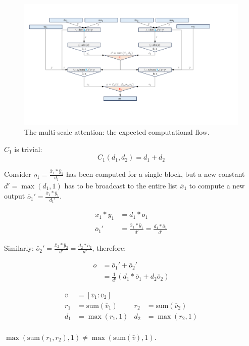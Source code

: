 \begin{figure}[h]
    \centering
    \includegraphics[width=1.\textwidth]{figures/multi-scale-attn2.pdf}
    \caption{The multi-scale attention: the expected computational flow.}
\end{figure}

$C_1$ is trivial:
$$C_1(d_1, d_2) = d_1+d_2$$

Consider $\bar{o}_1 = \frac{\bar{x}_1*\bar{y}_1}{d_1}$ has been computed for a single block, but a new constant $d'=\max(d_1, 1)$ has to be broadcast to the entire list $\bar{x}_1$ to compute a new output $\bar{o}_1'=\frac{\bar{x}_1*\bar{y}_1}{d_1'}$.

\begin{align*}
    \bar{x}_1*\bar{y}_1 &= d_1*\bar{o}_1 \\
    \bar{o}_1' &= \frac{\bar{x}_1*\bar{y}_1}{d'} = \frac{d_1 * \bar{o}_1}{d'}
\end{align*}

Similarly: $\bar{o}_2' = \frac{\bar{x}_2*\bar{y}_2}{d'} = \frac{d_2 * \bar{o}_2}{d'}$, therefore:

\begin{align*}
o&=\bar{o}_1'+\bar{o}_2' \\
&=\frac{1}{d'}(d_1*\bar{o}_1+d_2\bar{o}_2)
\end{align*}

\begin{align*}
\bar{v} &= [\bar{v}_1:\bar{v}_2] \\
r_1 &= \text{sum}(\bar{v}_1) & r_2 &= \text{sum}(\bar{v}_2) \\
d_1 &=\max(r_1, 1) &d_2 &= \max(r_2, 1) \\
\end{align*}

$\max(\text{sum}(r_1, r_2), 1) \ne \max(\text{sum}(\bar{v}), 1)$.

